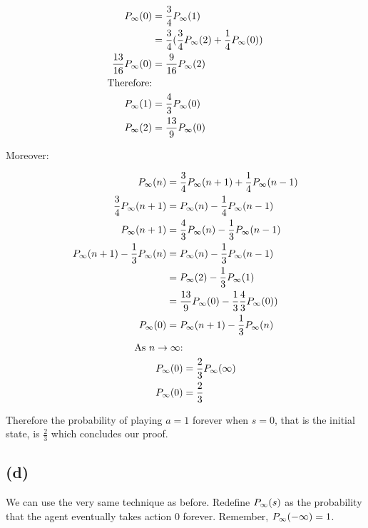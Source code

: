 \documentclass{article}
\begin{document}
\[
\begin{split}
  P_{\infty}(0)            & = \frac{3}{4}P_{\infty}(1) \\
                    & = \frac{3}{4}(\frac{3}{4}P_{\infty}(2) + \frac{1}{4}P_{\infty}(0)) \\
  \frac{13}{16}P_{\infty}(0)& = \frac{9}{16}P_{\infty}(2) \\
  \text{Therefore:} & \\
  P_{\infty}(1)            & = \frac{4}{3}P_{\infty}(0)\\
  P_{\infty}(2)            & = \frac{13}{9}P_{\infty}(0)\\
\end{split}
\]

Moreover:

\[
\begin{split}
  P_{\infty}(n)            & = \frac{3}{4}P_{\infty}(n + 1) + \frac{1}{4}P_{\infty}(n - 1) \\
  \frac{3}{4}P_{\infty}(n+1)& = P_{\infty}(n) - \frac{1}{4}P_{\infty}(n-1) \\
  P_{\infty}(n+1)          & = \frac{4}{3}P_{\infty}(n) - \frac{1}{3}P_{\infty}(n - 1) \\
  P_{\infty}(n+1) - \frac{1}{3}P_{\infty}(n) & = P_{\infty}(n) - \frac{1}{3}P_{\infty}(n - 1) \\
                    & = P_{\infty}(2) - \frac{1}{3}P_{\infty}(1) \\
                    & = \frac{13}{9}P_{\infty}(0) - \frac{1}{3}\frac{4}{3}P_{\infty}(0)) \\
  P_{\infty}(0)            & = P_{\infty}(n+1) - \frac{1}{3}P_{\infty}(n) \\
\end{split}
\]
\[
\begin{split}
  \text{As $n \to \infty$:} & \\
  P_{\infty}(0)            & = \frac{2}{3}P_{\infty}(\infty) \\
  P_{\infty}(0)            & = \frac{2}{3}
\end{split}
\]

Therefore the probability of playing $a = 1$ forever when $s = 0$, that is
the initial state, is $ \frac{2}{3}$ which concludes our proof.

\subsection{(d)} %

We can use the very same technique as before. Redefine $P_{\infty}(s)$ as the probability
that the agent eventually takes action $0$ forever. Remember, $P_{\infty}(-\infty) = 1$.
\end{document}
